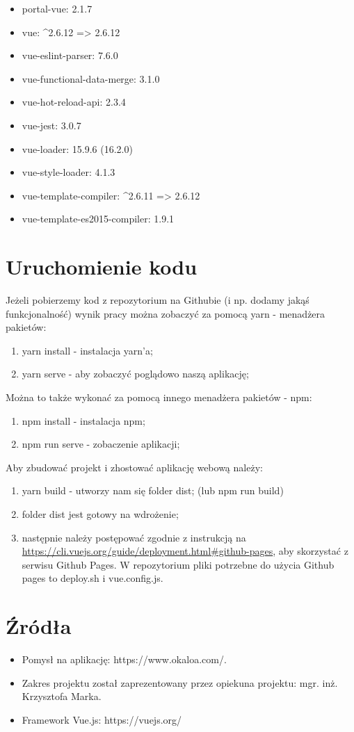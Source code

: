 \documentclass{article}
\begin{document}
\begin{itemize}
    \item portal-vue:  2.1.7
    \item vue: \^{}2.6.12 => 2.6.12
    \item vue-eslint-parser:  7.6.0
    \item vue-functional-data-merge:  3.1.0
    \item vue-hot-reload-api:  2.3.4
    \item vue-jest:  3.0.7
    \item vue-loader:  15.9.6 (16.2.0)
    \item vue-style-loader:  4.1.3
    \item vue-template-compiler: \^{}2.6.11 => 2.6.12
    \item vue-template-es2015-compiler:  1.9.1
\end{itemize}

\section{Uruchomienie kodu}
Jeżeli pobierzemy kod z repozytorium na Githubie (i np. dodamy jakąś funkcjonalność) wynik pracy można zobaczyć za pomocą yarn - menadżera pakietów:
\begin{enumerate}
    \item yarn install - instalacja yarn'a;
    \item yarn serve - aby zobaczyć poglądowo naszą aplikację;
\end{enumerate}

Można to także wykonać za pomocą innego menadżera pakietów - npm:
\begin{enumerate}
    \item npm install - instalacja npm;
    \item npm run serve - zobaczenie aplikacji;
\end{enumerate}

Aby zbudować projekt i zhostować aplikację webową należy:
\begin{enumerate}
    \item yarn build - utworzy nam się folder dist; (lub npm run build)
    \item folder dist jest gotowy na wdrożenie;
    \item następnie należy postępować zgodnie z instrukcją na \\ \href{https://cli.vuejs.org/guide/deployment.html#github-pages}{https://cli.vuejs.org/guide/deployment.html\#github-pages}, aby skorzystać z serwisu Github Pages.
    W repozytorium pliki potrzebne do użycia Github pages to deploy.sh i vue.config.js.
\end{enumerate}

\section{Źródła}
\begin{itemize}
    \item Pomysł na aplikację: https://www.okaloa.com/.
    \item Zakres projektu został zaprezentowany przez opiekuna projektu: mgr. inż. Krzysztofa Marka.
    \item Framework Vue.js: https://vuejs.org/
\end{itemize}
\end{document}
